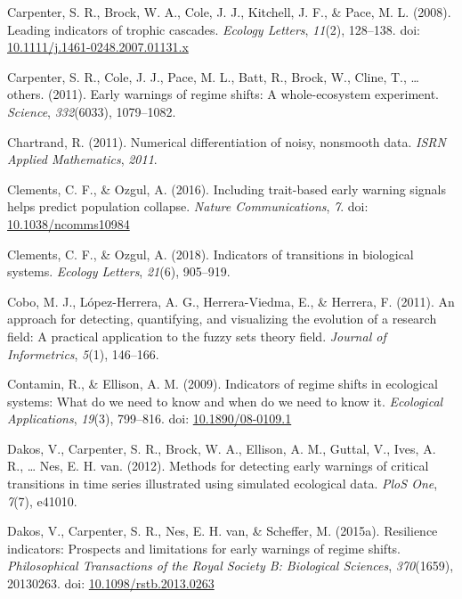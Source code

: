 \documentclass[12pt,twoside,openany]{reedthesis}
\begin{document}
\leavevmode\hypertarget{ref-carpenter_leading_2008}{}%
Carpenter, S. R., Brock, W. A., Cole, J. J., Kitchell, J. F., \& Pace, M. L. (2008). Leading indicators of trophic cascades. \emph{Ecology Letters}, \emph{11}(2), 128--138. doi: \href{https://doi.org/10.1111/j.1461-0248.2007.01131.x}{10.1111/j.1461-0248.2007.01131.x}

\leavevmode\hypertarget{ref-carpenter2011early}{}%
Carpenter, S. R., Cole, J. J., Pace, M. L., Batt, R., Brock, W., Cline, T., \ldots{} others. (2011). Early warnings of regime shifts: A whole-ecosystem experiment. \emph{Science}, \emph{332}(6033), 1079--1082.

\leavevmode\hypertarget{ref-chartrand2011numerical}{}%
Chartrand, R. (2011). Numerical differentiation of noisy, nonsmooth data. \emph{ISRN Applied Mathematics}, \emph{2011}.

\leavevmode\hypertarget{ref-clements_including_2016}{}%
Clements, C. F., \& Ozgul, A. (2016). Including trait-based early warning signals helps predict population collapse. \emph{Nature Communications}, \emph{7}. doi: \href{https://doi.org/10.1038/ncomms10984}{10.1038/ncomms10984}

\leavevmode\hypertarget{ref-clements2018indicators}{}%
Clements, C. F., \& Ozgul, A. (2018). Indicators of transitions in biological systems. \emph{Ecology Letters}, \emph{21}(6), 905--919.

\leavevmode\hypertarget{ref-cobo2011approach}{}%
Cobo, M. J., López-Herrera, A. G., Herrera-Viedma, E., \& Herrera, F. (2011). An approach for detecting, quantifying, and visualizing the evolution of a research field: A practical application to the fuzzy sets theory field. \emph{Journal of Informetrics}, \emph{5}(1), 146--166.

\leavevmode\hypertarget{ref-contamin_indicators_2009}{}%
Contamin, R., \& Ellison, A. M. (2009). Indicators of regime shifts in ecological systems: What do we need to know and when do we need to know it. \emph{Ecological Applications}, \emph{19}(3), 799--816. doi: \href{https://doi.org/10.1890/08-0109.1}{10.1890/08-0109.1}

\leavevmode\hypertarget{ref-dakos_methods_2012}{}%
Dakos, V., Carpenter, S. R., Brock, W. A., Ellison, A. M., Guttal, V., Ives, A. R., \ldots{} Nes, E. H. van. (2012). Methods for detecting early warnings of critical transitions in time series illustrated using simulated ecological data. \emph{PloS One}, \emph{7}(7), e41010.

\leavevmode\hypertarget{ref-dakos_resilience_2015}{}%
Dakos, V., Carpenter, S. R., Nes, E. H. van, \& Scheffer, M. (2015a). Resilience indicators: Prospects and limitations for early warnings of regime shifts. \emph{Philosophical Transactions of the Royal Society B: Biological Sciences}, \emph{370}(1659), 20130263. doi: \href{https://doi.org/10.1098/rstb.2013.0263}{10.1098/rstb.2013.0263}
\end{document}
